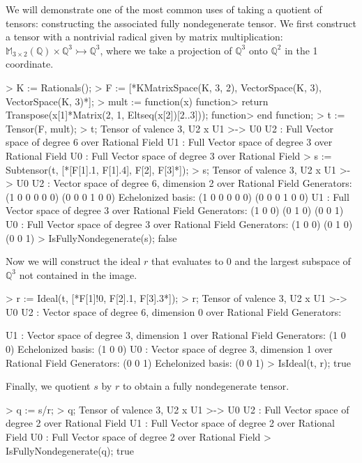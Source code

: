 \begin{example}[Quotients]

We will demonstrate one of the most common uses of taking a quotient of tensors:
constructing the associated fully nondegenerate tensor. We first construct a
tensor with a nontrivial radical given by matrix multiplication:
$\mathbb{M}_{3\times 2}(\mathbb{Q})\times \mathbb{Q}^3\rightarrowtail
\mathbb{Q}^3$, where we take a projection of $\mathbb{Q}^3$ onto $\mathbb{Q}^2$
in the 1 coordinate.
\begin{code}
> K := Rationals();
> F := [*KMatrixSpace(K, 3, 2), VectorSpace(K, 3), VectorSpace(K, 3)*];
> mult := function(x)
function>   return Transpose(x[1]*Matrix(2, 1, Eltseq(x[2])[2..3]));
function> end function;
> t := Tensor(F, mult);
> t;
Tensor of valence 3, U2 x U1 >-> U0
U2 : Full Vector space of degree 6 over Rational Field
U1 : Full Vector space of degree 3 over Rational Field
U0 : Full Vector space of degree 3 over Rational Field
> s := Subtensor(t, [*[F[1].1, F[1].4], F[2], F[3]*]);
> s;
Tensor of valence 3, U2 x U1 >-> U0
U2 : Vector space of degree 6, dimension 2 over Rational Field
Generators:
(1 0 0 0 0 0)
(0 0 0 1 0 0)
Echelonized basis:
(1 0 0 0 0 0)
(0 0 0 1 0 0)
U1 : Full Vector space of degree 3 over Rational Field
Generators:
(1 0 0)
(0 1 0)
(0 0 1)
U0 : Full Vector space of degree 3 over Rational Field
Generators:
(1 0 0)
(0 1 0)
(0 0 1)
> IsFullyNondegenerate(s);
false
\end{code}

Now we will construct the ideal $r$ that evaluates to 0 and the largest subspace
of $\mathbb{Q}^3$ not contained in the image.
\begin{code}
> r := Ideal(t, [*F[1]!0, F[2].1, F[3].3*]);
> r;
Tensor of valence 3, U2 x U1 >-> U0
U2 : Vector space of degree 6, dimension 0 over Rational Field
Generators:

U1 : Vector space of degree 3, dimension 1 over Rational Field
Generators:
(1 0 0)
Echelonized basis:
(1 0 0)
U0 : Vector space of degree 3, dimension 1 over Rational Field
Generators:
(0 0 1)
Echelonized basis:
(0 0 1)
> IsIdeal(t, r);
true
\end{code}

Finally, we quotient $s$ by $r$ to obtain a fully nondegenerate tensor.
\begin{code}
> q := s/r;
> q;
Tensor of valence 3, U2 x U1 >-> U0
U2 : Full Vector space of degree 2 over Rational Field
U1 : Full Vector space of degree 2 over Rational Field
U0 : Full Vector space of degree 2 over Rational Field
> IsFullyNondegenerate(q);
true
\end{code}
\end{example}

